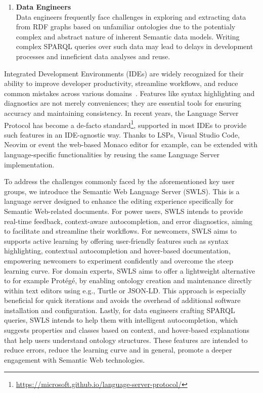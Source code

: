 \begin{enumerate}
  \item \textbf{Data Engineers}\\
    Data engineers frequently face challenges in exploring and extracting data from RDF graphs based on unfamiliar ontologies due to the potentialy complex and abstract nature of inherent Semantic data models.
    Writing complex SPARQL queries over such data may lead to delays in development processes and inneficient data analyses and reuse. 
\end{enumerate}

Integrated Development Environments (IDEs) are widely recognized for their ability to improve developer productivity, streamline workflows, and reduce common mistakes across various domains~\cite{javaEngineer}. 
Features like syntax highlighting and diagnostics are not merely conveniences; they are essential tools for ensuring accuracy and maintaining consistency. 
In recent years, the Language Server Protocol has become a de-facto standard\footnote{\url{https://microsoft.github.io/language-server-protocol/}}, supported in most IDEs to provide such features in an IDE-agnostic way.
Thanks to LSPs, Visual Studio Code, Neovim or event the web-based Monaco editor for example, can be extended with language-specific functionalities by reusing the same Language Server implementation.

To address the challenges commonly faced by the aforementioned key user groups, we introduce the Semantic Web Language Server (SWLS).
This is a language server designed to enhance the editing experience specifically for Semantic Web-related documents. 
For power users, SWLS intends to provide real-time feedback, context-aware autocompletion, and error diagnostics, aiming to facilitate and streamline their workflows.
For newcomers, SWLS aims to supports active learning by offering user-friendly features such as syntax highlighting, contextual autocompletion and hover-based documentation, empowering newcomers to experiment confidently and overcome the steep learning curve.
For domain experts, SWLS aims to offer a lightweight alternative to for example Protégé, by enabling ontology creation and maintenance directly within text editors using e.g., Turtle or JSON-LD.
This approach is especially beneficial for quick iterations and avoids the overhead of additional software installation and configuration.
Lastly, for data engineers crafting SPARQL queries, SWLS intends to help them with intelligent autocompletion, which suggests properties and classes based on context, and hover-based explanations that help users understand ontology structures.
These features are intended to reduce errors, reduce the learning curve and in general, promote a deeper engagement with Semantic Web technologies.

